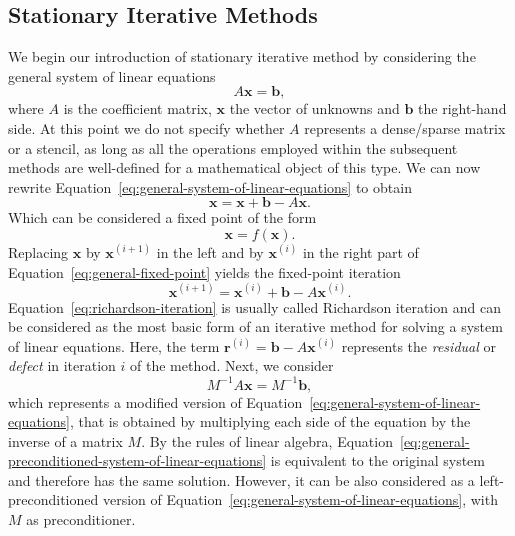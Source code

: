 \subsection{Stationary Iterative Methods} 
We begin our introduction of stationary iterative method by considering the general system of linear equations
\begin{equation}
	A \bm{x} = \bm{b},
	\label{eq:general-system-of-linear-equations}
\end{equation}
where $A$ is the coefficient matrix, $\bm x$ the vector of unknowns and $\bm b$ the right-hand side.
At this point we do not specify whether $A$ represents a dense/sparse matrix or a stencil, as long as all the operations employed within the subsequent methods are well-defined for a mathematical object of this type.
We can now rewrite Equation~\eqref{eq:general-system-of-linear-equations} to obtain
\begin{equation}
	\bm{x} = \bm{x} + \bm b - A \bm{x}.
	\label{eq:general-fixed-point}
\end{equation}
Which can be considered a fixed point of the form
\begin{equation}
	\bm x = f(\bm x).
\end{equation} 
Replacing $\bm x$ by $\bm{x}^{(i+1)}$ in the left and by $\bm{x}^{(i)}$ in the right part of Equation~\eqref{eq:general-fixed-point} yields the fixed-point iteration
\begin{equation}
	\bm{x}^{(i+1)} = \bm{x}^{(i)} + \bm b - A \bm{x}^{(i)}.
	\label{eq:richardson-iteration}
\end{equation}
Equation~\eqref{eq:richardson-iteration} is usually called Richardson iteration and can be considered as the most basic form of an iterative method for solving a system of linear equations.
Here, the term $\bm{r}^{(i)} = \bm{b} - A \bm{x}^{(i)}$ represents the \emph{residual} or \emph{defect} in iteration $i$ of the method.
Next, we consider 
\begin{equation}
	M^{-1} A \bm{x} = M^{-1} \bm{b},
	\label{eq:general-preconditioned-system-of-linear-equations}
\end{equation}
which represents a modified version of Equation~\eqref{eq:general-system-of-linear-equations}, that is obtained by multiplying each side of the equation by the inverse of a matrix $M$.
By the rules of linear algebra, Equation~\eqref{eq:general-preconditioned-system-of-linear-equations} is equivalent to the original system and therefore has the same solution.
However, it can be also considered as a left-preconditioned version of Equation~\eqref{eq:general-system-of-linear-equations}, with $M$ as preconditioner.
